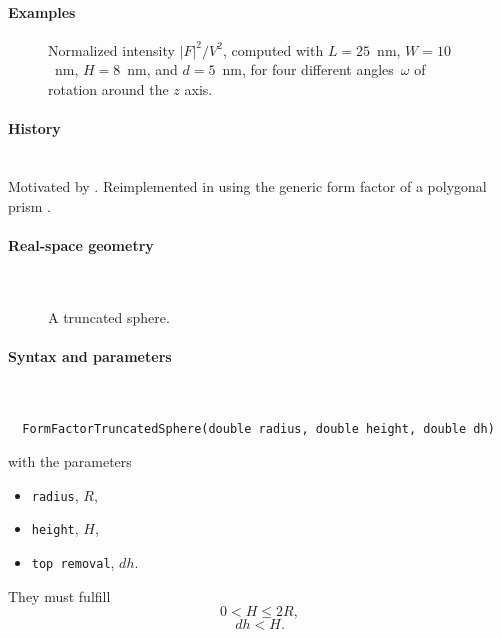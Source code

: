 \paragraph{Examples}\strut

\begin{figure}[H]
\begin{center}
\end{center}
\caption{Normalized intensity $|F|^2/V^2$,
computed with $L=25$~nm, $W=10$~nm, $H=8$~nm, and $d=5$~nm,
for four different angles~$\omega$ of rotation around the $z$ axis.}
\end{figure}

\paragraph{History}\strut\\
Motivated by \cite{HeSS74}.
Reimplemented in  using the generic form factor
of a polygonal prism \cite{Wut17}.


\label{STruncatedSphere}

\paragraph{Real-space geometry}\strut\\

\begin{figure}[H]
\hfill
{}
\hfill
{}
\hfill
{}
\hfill
\caption{A truncated sphere.}
\end{figure}
\FloatBarrier

\paragraph{Syntax and parameters}\strut\\[-2ex plus .2ex minus .2ex]
\begin{lstlisting}
  FormFactorTruncatedSphere(double radius, double height, double dh)
\end{lstlisting}
with the parameters
\begin{itemize}
\item \texttt{radius}, $R$,
\item \texttt{height}, $H$,
\item \texttt{top removal}, $dh$.
\end{itemize}
They must fulfill
\begin{equation*}
   0 < H\leq 2R,
\end{equation*}
\begin{equation*}
  dh < H.
\end{equation*}

